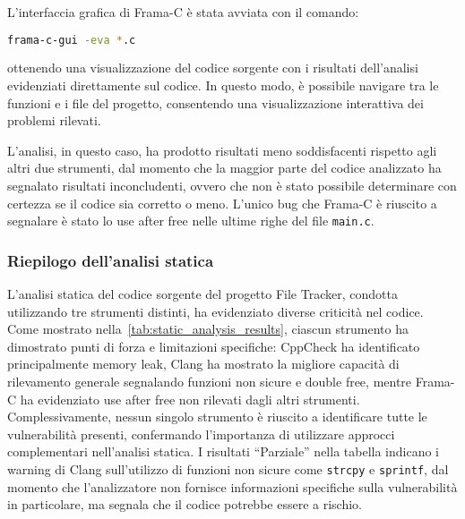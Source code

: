 L'interfaccia grafica di Frama-C è stata avviata con il comando:
\begin{lstlisting}[language=bash, numbers=none]
frama-c-gui -eva *.c
\end{lstlisting}
ottenendo una visualizzazione del codice sorgente con i risultati dell'analisi
evidenziati direttamente sul codice. In questo modo, è possibile navigare tra le
funzioni e i file del progetto, consentendo una visualizzazione interattiva dei problemi
rilevati.

L'analisi, in questo caso, ha prodotto risultati meno soddisfacenti rispetto agli
altri due strumenti, dal momento che la maggior parte del codice analizzato ha
segnalato risultati inconcludenti, ovvero che non è stato possibile determinare con
certezza se il codice sia corretto o meno. L'unico bug che Frama-C è riuscito a
segnalare è stato lo use after free nelle ultime righe del file \texttt{main.c}.

\subsubsection*{Riepilogo dell'analisi statica}
L'analisi statica del codice sorgente del progetto File Tracker, condotta
utilizzando tre strumenti distinti, ha evidenziato diverse criticità nel codice.
Come mostrato nella~\autoref{tab:static_analysis_results}, ciascun strumento ha dimostrato
punti di forza e limitazioni specifiche: CppCheck ha identificato principalmente
memory leak, Clang ha mostrato la migliore capacità di rilevamento generale segnalando
funzioni non sicure e double free, mentre Frama-C ha evidenziato use after free
non rilevati dagli altri strumenti. Complessivamente, nessun singolo strumento è
riuscito a identificare tutte le vulnerabilità presenti, confermando l'importanza
di utilizzare approcci complementari nell'analisi statica. I risultati ``Parziale''
nella tabella indicano i warning di Clang sull'utilizzo di funzioni non sicure
come \texttt{strcpy} e \texttt{sprintf}, dal momento che l'analizzatore non fornisce
informazioni specifiche sulla vulnerabilità in particolare, ma segnala che il
codice potrebbe essere a rischio.

